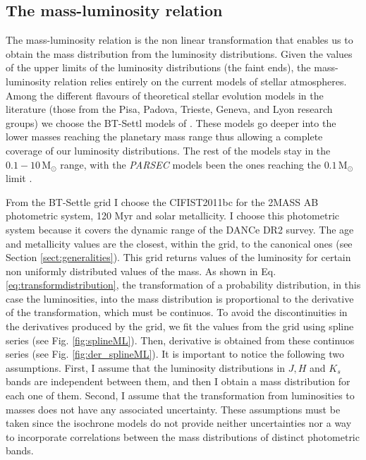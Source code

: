 \subsection{The mass-luminosity relation}
\label{sect:mass-luminosity}
The mass-luminosity relation is the non linear transformation that enables us to obtain the mass distribution from the luminosity distributions. Given the values of the upper limits of the luminosity distributions (the faint ends), the mass-luminosity relation relies entirely on the current models of stellar atmospheres. Among the different flavours of theoretical stellar evolution models in the literature (those from the Pisa, Padova, Trieste, Geneva, and Lyon research groups)  we choose the BT-Settl models of \citet{Allard2012}. These models go deeper into the lower masses reaching the planetary mass range thus allowing a complete coverage of our luminosity distributions. The rest of the models stay in the $0.1-10\,\mathrm{M_{\odot}}$ range, with the \emph{PARSEC} models been the ones reaching the $0.1\,\mathrm{M_{\odot}}$ limit \citep{Bressan2012}. 

From the BT-Settle grid I choose the CIFIST2011bc for the 2MASS AB photometric system, 120 Myr and solar metallicity. I choose this photometric system because it covers the dynamic range of the DANCe DR2 survey. The age and metallicity values are the closest, within the grid, to the canonical ones (see Section \ref{sect:generalities}). This grid returns values of the luminosity for certain non uniformly distributed values of the mass. As shown in Eq. \ref{eq:transformdistribution}, the transformation of a probability distribution, in this case the luminosities, into the mass distribution is proportional to the derivative of the transformation, which must be continuos. To avoid the discontinuities in the derivatives produced by the grid, we fit the values from the grid using spline series (see Fig. \ref{fig:splineML}). Then, derivative is obtained from these continuos series (see Fig. \ref{fig:der_splineML}). It is important to notice the following two assumptions. First, I assume that the luminosity distributions in $J,H$ and $K_s$ bands are independent between them, and then I obtain a mass distribution for each one of them. Second, I assume that the transformation from luminosities to masses does not have any associated uncertainty. These assumptions must be taken since the isochrone models do not provide neither uncertainties nor a way to incorporate correlations between the mass distributions of distinct photometric bands. 


